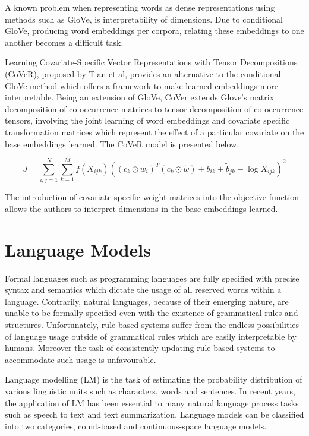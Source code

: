 \noindent
\newline
A known problem when representing words as dense representations using methods such as GloVe, is interpretability of dimensions. Due to conditional GloVe, producing word embeddings per corpora, relating these embeddings to one another becomes a difficult task. 


\noindent
\newline
Learning Covariate-Specific Vector Representations with Tensor Decompositions (CoVeR), proposed by Tian et al, provides an alternative to the conditional GloVe method which offers a framework to make learned embeddings more interpretable. Being an extension of GloVe, CoVer extends Glove's matrix decomposition of co-occurrence matrices to tensor decomposition of co-occurrence tensors, involving the joint learning of word embeddings and covariate specific transformation matrices which represent the effect of a particular covariate on the base embeddings learned. The CoVeR model is presented below.

\begin{equation}
J = \sum_{i, j=1}^{N} \sum_{k=1}^{M} f(X_{ijk}) ((c_{k} \odot w_{i})^{T} (c_{k} \odot \tilde{w}) + b_{ik} + \tilde{b}_{jk} - \log{X_{ijk}})^{2}
\end{equation}

\noindent
\newline
The introduction of covariate specific weight matrices into the objective function allows the authors to interpret dimensions in the base embeddings learned. 


\section{Language Models}
Formal languages such as programming languages are fully specified with precise syntax and semantics which dictate the usage of all reserved words within a language. Contrarily, natural languages, because of their emerging nature, are unable to be formally specified even with the existence of grammatical rules and structures. Unfortunately, rule based systems suffer from the endless possibilities of language usage outside of grammatical rules which are easily interpretable by humans. Moreover the task of consistently updating rule based systems to accommodate such usage is unfavourable.  

\noindent
\newline
Language modelling (LM) is the task of estimating the probability distribution of various linguistic units such as characters, words and sentences. In recent years, the application of LM  has been essential to many natural language process tasks such as speech to text and text summarization. Language models can be classified into two categories, count-based and continuous-space language models. 

